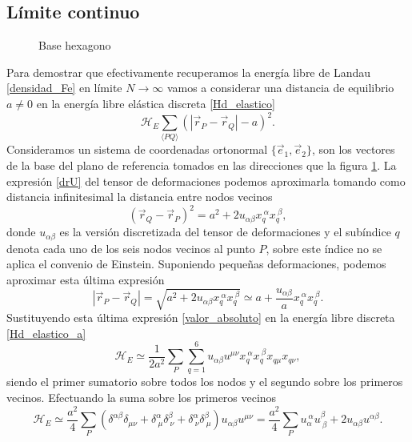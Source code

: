 \subsection{Límite continuo}
\begin{figure}[h]
\centering
 \resizebox{\columnwidth}{!}{}
\caption{Base hexagono}\label{base-hexagono-fig}
\end{figure}   
Para demostrar que efectivamente recuperamos la energía libre de Landau
\eqref{densidad_Fe} en límite $N\rightarrow \infty$ vamos a considerar una
distancia de equilibrio  $a\neq 0$ en la energía libre elástica discreta
\eqref{Hd_elastico}
\begin{equation}\label{Hd_elastico_a}
\mathcal{H}_E\sum_{\langle PQ
  \rangle}(|\vec{r}_P-\vec{r}_Q|-a)^2.
\end{equation}
Consideramos un sistema de coordenadas ortonormal $\{ \vec{e}_1,\vec{e}_2\}$,
son los vectores de la base del plano de referencia tomados en las direcciones
que la figura \ref{base-hexagono-fig}. La expresión \eqref{drU} del tensor de
deformaciones podemos aproximarla tomando como distancia infinitesimal la
distancia entre nodos vecinos \cite{Bowick:Membranes_review,Bowick_flat_phase}
\begin{equation*}
(\vec{r}_Q-\vec{r}_P)^2=a^2+2u_{\alpha\beta}x_q^{\ \alpha}x_q^{\ \beta},
\end{equation*}
donde $u_{\alpha\beta}$ es la versión discretizada del tensor de
deformaciones y el subíndice $q$ denota cada uno de los seis nodos vecinos al punto
$P$, sobre este índice no se aplica el convenio de Einstein. Suponiendo
pequeñas deformaciones, podemos aproximar esta última expresión
\begin{equation}\label{valor_absoluto}
|\vec{r}_P-\vec{r}_Q|=\sqrt{a^2+2u_{\alpha\beta}x_q^{\ \alpha}x_q^{\ \beta}}\simeq a + \frac{u_{\alpha\beta}}{a}x_q^{\ \alpha}x_q^{\ \beta}.
\end{equation}
Sustituyendo esta última expresión \eqref{valor_absoluto} en la energía libre discreta \eqref{Hd_elastico_a}
\begin{equation}\label{He}
\mathcal{H}_E\simeq \frac{1}{2a^2}\sum_{P} \sum^6_{q=1} u_{\alpha\beta}u^{\mu\nu}x_q^{\ \alpha}x_q^{\ \beta}x_{q\mu}x_{q\nu},
\end{equation}
siendo el primer sumatorio sobre todos los nodos y el segundo sobre los
primeros vecinos. Efectuando la suma sobre los primeros vecinos 
\begin{equation*}
\mathcal{H}_E\simeq\frac{a^2}{4}\sum_{P}(\delta^{\alpha\beta}\delta_{\mu\nu}+\delta^{\alpha}_{\ \mu}\delta^{\beta}_{\ \nu}+
\delta^{\alpha}_{\ \nu}\delta^{\beta}_{\ \mu})
u_{\alpha\beta}u^{\mu\nu}=\frac{a^2}{4}\sum_{P}u_{\alpha}^{\ \alpha}u^{\beta}_{\ \beta}+2u_{\alpha\beta}u^{\alpha\beta}.
\end{equation*}
